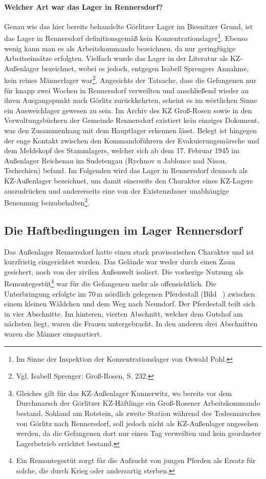 \documentclass[a4paper,12pt,ngerman,
]{nisebook}
\begin{document}
\paragraph{Welcher Art war das Lager in Rennersdorf?} Genau wie das hier bereits behandelte Görlitzer Lager im Biesnitzer Grund, ist das Lager in Rennersdorf definitionsgemäß kein Konzentrationslager\footnote{Im Sinne der Inspektion der Konzentrationslager von Oswald Pohl.}. Ebenso wenig kann man es als Arbeitskommando bezeichnen, da nur geringfügige Arbeitseinsätze erfolgten. 
Vielfach wurde das Lager in der Literatur als KZ-Außenlager bezeichnet, wobei es jedoch, entgegen Isabell Sprengers Annahme, kein reines Männerlager war\footnote{Vgl. Isabell Sprenger: Groß-Rosen, S. 232.}. Angesichts der Tatsache, dass die Gefangenen nur für knapp zwei Wochen in Rennersdorf verweilten und anschließend wieder an ihren Ausgangspunkt nach Görlitz zurückkehrten, scheint es im wörtlichen Sinne ein Ausweichlager gewesen zu sein. Im Archiv des KZ Groß-Rosen sowie in den Verwaltungsbüchern der Gemeinde Rennersdorf existiert kein einziges Dokument, was den Zusammenhang mit dem Hauptlager erkennen lässt. Belegt ist hingegen der enge Kontakt zwischen den Kommandoführern der Evakuierungsmärsche und dem Meldekopf des Stammlagers, welcher sich ab dem 17. Februar 1945 im Außenlager Reichenau im Sudetengau (Rychnov u Jablonce nad Nisou, Tschechien) befand. 
Im Folgenden wird das Lager in Rennersdorf dennoch als KZ-Außenlager bezeichnet, um damit einerseits den Charakter eines KZ-Lagers auszudrücken und andererseits eine von der Existenzdauer unabhängige Benennung beizubehalten\footnote{Gleiches gilt für das KZ-Außenlager Kunnerwitz, wo bereits vor dem Durchmarsch der Görlitzer KZ-Häftlinge ein Groß-Rosener Arbeitskommando bestand. Sohland am Rotstein, als zweite Station während des Todesmarsches von Görlitz nach Rennersdorf, soll jedoch nicht als KZ-Außenlager angesehen werden, da die Gefangenen dort nur einen Tag verweilten und kein geordneter Lagerbetrieb errichtet bestand.}. 





\subsection{Die Haftbedingungen im Lager Rennersdorf}
Das Außenlager Rennersdorf hatte einen stark provisorischen Charakter und ist kurzfristig eingerichtet worden. Das Gelände war weder durch
einen Zaun gesichert, noch von der zivilen Außenwelt isoliert. Die vorherige Nutzung als Remontegestüt\footnote{Ein Remontegestüt sorgt für die Aufzucht von jungen Pferden als Ersatz für solche, die durch Krieg oder andersartig sterben.} war für die Gefangenen mehr als offensichtlich. Die Unterbringung erfolgte im 70\,m nördlich gelegenen Pferdestall (Bild ~) zwischen einem kleinen Wäldchen und dem Weg nach Neundorf.
Der Pferdestall teilt sich in vier Abschnitte. Im hinteren, vierten Abschnitt, welcher dem Gutshof am nächsten liegt, waren die Frauen untergebracht. In den anderen drei Abschnitten waren die Männer einquartiert.
\end{document}
